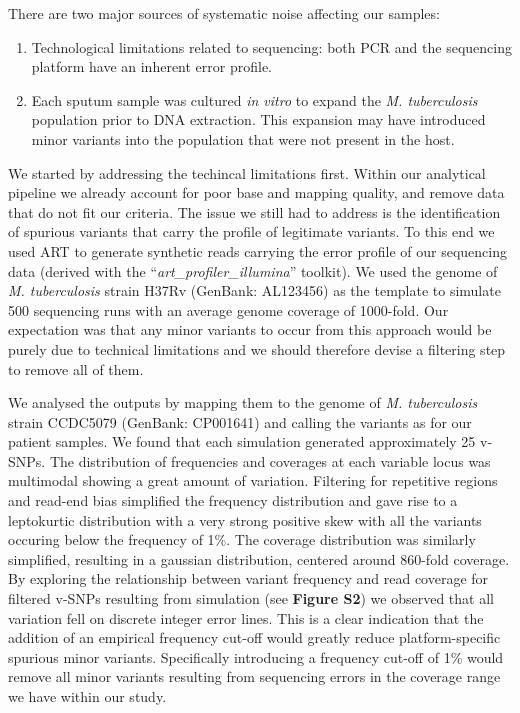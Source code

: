 \documentclass[12pt, oneside]{article}   	%
\begin{document}
\noindent There are two major sources of systematic noise affecting our samples:
\begin{enumerate}
   \item Technological limitations related to sequencing: both PCR and the sequencing platform have an inherent error profile.
   \item Each sputum sample was cultured \textsl{in vitro} to expand the \textsl{M. tuberculosis} population prior to DNA extraction. This expansion may have introduced minor variants into the population that were not present in the host.
\end{enumerate}

We started by addressing the techincal limitations first. Within our analytical pipeline we already account for poor base and mapping quality, and remove data that do not fit our criteria. The issue we still had to address is the identification of spurious variants that carry the profile of legitimate variants. To this end we used ART \cite{ART} to generate synthetic reads carrying the error profile of our sequencing data (derived with the ``\textsl{art\_profiler\_illumina}'' toolkit). We used the genome of \textsl{M. tuberculosis} strain H37Rv (GenBank: AL123456) as the template to simulate 500 sequencing runs with an average genome coverage of 1000-fold. Our expectation was that any minor variants to occur from this approach would be purely due to technical limitations and we should therefore devise a filtering step to remove all of them.

We analysed the outputs by mapping them to the genome of \textsl{M. tuberculosis} strain CCDC5079 (GenBank: CP001641) and calling the variants as for our patient samples. We found that each simulation generated approximately 25 v-SNPs. The distribution of frequencies and coverages at each variable locus was multimodal showing a great amount of variation. Filtering for repetitive regions and read-end bias simplified the frequency distribution and gave rise to a leptokurtic distribution with a very strong positive skew with all the variants occuring below the frequency of 1\%. The coverage distribution was similarly simplified, resulting in a gaussian distribution, centered around 860-fold coverage. By exploring the relationship between variant frequency and read coverage for filtered v-SNPs resulting from simulation (see \textbf{Figure S2}) we observed that all variation fell on discrete integer error lines. This is a clear indication that the addition of an empirical frequency cut-off would greatly reduce platform-specific spurious minor variants. Specifically introducing a frequency cut-off of 1\% would remove all minor variants resulting from sequencing errors in the coverage range we have within our study.
\end{document}
